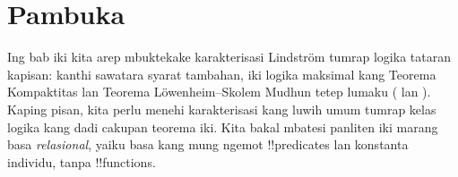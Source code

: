 \documentclass[../../../include/open-logic-section]{subfiles}
\begin{document}
\section{Pambuka}

Ing bab iki kita arep mbuktekake karakterisasi Lindstr\"om
tumrap logika tataran kapisan: kanthi sawatara syarat tambahan,
iki logika maksimal kang Teorema Kompaktitas lan Teorema
L\"owenheim--Skolem Mudhun tetep lumaku
( lan
). Kaping pisan, kita
perlu menehi karakterisasi kang luwih umum tumrap kelas
logika kang dadi cakupan teorema iki. Kita bakal mbatesi
panliten iki marang basa \emph{relasional}, yaiku basa kang
mung ngemot !!{predicate}s lan konstanta individu, tanpa
!!{function}s.
\end{document}
